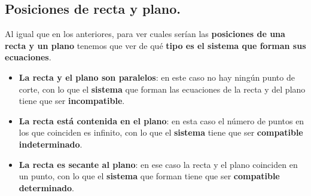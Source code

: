 \documentclass[a4paper,11pt,answers]{exam}
\begin{document}
\subsection{Posiciones de recta y plano.}
Al igual que en los anteriores, para ver cuales serían las \textbf{posiciones de una recta y un plano} tenemos que ver de qué \textbf{tipo es el sistema que forman sus ecuaciones}.
\begin{itemize}
\item \textbf{La recta y el plano son paralelos}: en este caso no hay ningún punto de corte, con lo que el \textbf{sistema} que forman las ecuaciones de la recta y del plano tiene que ser \textbf{incompatible}.
\item \textbf{La recta está contenida en el plano}: en esta caso el número de puntos en los que coinciden es infinito, con lo que el \textbf{sistema} tiene que ser \textbf{compatible indeterminado}.
  \item \textbf{La recta es secante al plano}: en ese caso la recta y el plano coinciden en un punto, con lo que el \textbf{sistema} que forman tiene que ser \textbf{compatible determinado}.
\end{itemize}
\end{document}

